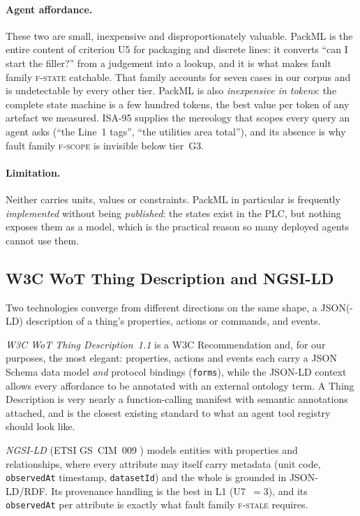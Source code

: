 \paragraph{Agent affordance.} These two are small, inexpensive and
disproportionately valuable. PackML is the entire content of criterion U5 for
packaging and discrete lines: it converts ``can I start the filler?'' from a
judgement into a lookup, and it is what makes fault family \textsc{f-state}
catchable. That family accounts for seven cases in our corpus and is undetectable
by every other tier. PackML is also \emph{inexpensive in tokens}: the complete
state machine is a few hundred tokens, the best value per token of any artefact we
measured. ISA-95 supplies the mereology that
scopes every query an agent asks (``the Line~1 tags'', ``the utilities area
total''), and its absence is why fault family \textsc{f-scope} is invisible below
tier~G3.

\paragraph{Limitation.} Neither carries units, values or constraints. PackML in
particular is frequently \emph{implemented} without being \emph{published}: the
states exist in the PLC, but nothing exposes them as a model, which is the
practical reason so many deployed agents cannot use them.

\subsection{W3C WoT Thing Description and NGSI-LD}

Two technologies converge from different directions on the same shape, a
JSON(-LD) description of a thing's properties, actions or commands, and events.

\emph{W3C WoT Thing Description~1.1} \cite{w3c2023wot} is a W3C Recommendation
and, for our purposes, the most elegant: properties, actions and events each
carry a JSON Schema data model \emph{and} protocol bindings (\texttt{forms}),
while the JSON-LD context allows every affordance to be annotated with an
external ontology term. A Thing Description is very nearly a function-calling
manifest with semantic annotations attached, and is the closest existing
standard to what an agent tool registry should look like.

\emph{NGSI-LD} (ETSI GS~CIM~009 \cite{etsi2023ngsild}) models entities with
properties and relationships, where every attribute may itself carry metadata
(unit code, \texttt{observedAt} timestamp, \texttt{datasetId}) and the whole is
grounded in JSON-LD/RDF. Its provenance handling is the best in L1 (U7~$=3$), and its
\texttt{observedAt} per attribute is exactly what fault family
\textsc{f-stale} requires.


